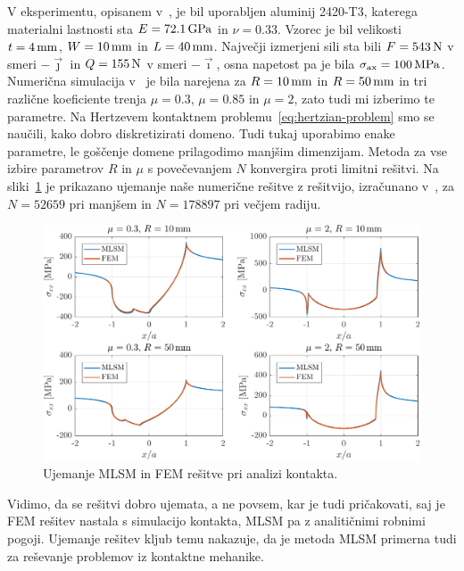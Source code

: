 \documentclass[12pt,a4paper,twoside]{article}
\theoremstyle{definition} %
\theoremstyle{plain} %
\numberwithin{equation}{section}
\newcommand{\vi}{\vec{\imath}}
\newcommand{\vj}{\vec{\jmath}}
\newcommand{\sax}{\ensuremath{\sigma_{\text{ax}}}}
\begin{document}
V eksperimentu, opisanem v~\cite{hojjati2014prediction}, je bil uporabljen aluminij 2420-T3, katerega
materialni lastnosti sta  $E = \unit[72.1]{GPa}$ in $\nu = 0.33$. Vzorec je bil velikosti $t =
\unit[4]{mm}$, $W = \unit[10]{mm}$ in $L = \unit[40]{mm}$. Največji izmerjeni sili sta bili $F =
\unit[543]{N}$ v smeri $-\vj$ in $Q = \unit[155]{N}$ v smeri $-\vi$, osna napetost pa je bila $\sax
= \unit[100]{MPa}$. Numerična simulacija v~\cite{pereira2016convergence} je bila narejena za $R =
\unit[10]{mm}$ in $R = \unit[50]{mm}$ in tri različne koeficiente trenja $\mu = 0.3$, $\mu = 0.85$
in $\mu = 2$, zato tudi mi izberimo te parametre. Na Hertzevem kontaktnem
problemu~\eqref{eq:hertzian-problem} smo se naučili, kako dobro diskretizirati domeno. Tudi tukaj
uporabimo enake parametre, le goščenje domene prilagodimo manjšim dimenzijam. Metoda za vse
izbire parametrov $R$ in $\mu$ s povečevanjem $N$ konvergira proti limitni rešitvi. Na
sliki~\ref{fig:fwo-ujemanje} je prikazano ujemanje naše numerične rešitve z rešitvijo, izračunano
v~\cite{pereira2016convergence}, za $N = 52659$ pri manjšem in $N = 178897$ pri večjem radiju.

\begin{figure}[h]
  \centering
  \includegraphics[width=\textwidth]{images/fwo_cases.pdf}
  \vspace{-4ex}
  \caption[Ujemanje MLSM in FEM rešitve pri analizi kontakta.]{Ujemanje MLSM in FEM rešitve pri
  analizi kontakta.}
  \label{fig:fwo-ujemanje}
\end{figure}

Vidimo, da se rešitvi dobro ujemata, a ne povsem, kar je tudi pričakovati, saj je FEM rešitev
nastala s simulacijo kontakta, MLSM pa z analitičnimi robnimi pogoji. Ujemanje rešitev kljub temu
nakazuje, da je metoda MLSM primerna tudi za reševanje problemov iz kontaktne mehanike.
\end{document}
